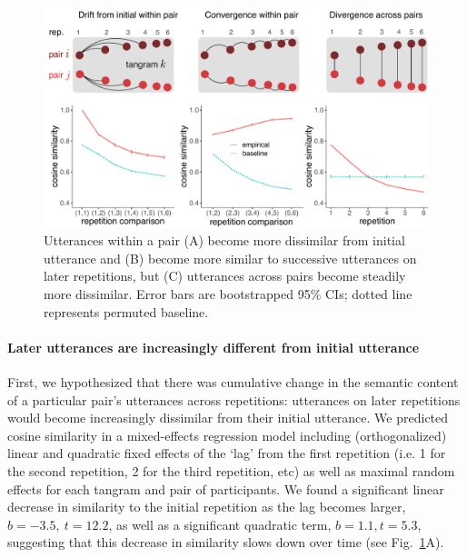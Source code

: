 \documentclass[alpha-refs]{wiley-article}
\begin{document}
\begin{figure}[t]
\includegraphics[scale=.5]{similarity_analysis.pdf}
\vspace{1em}
\caption{Utterances within a pair (A) become more dissimilar from initial utterance and (B) become more similar to successive utterances on later repetitions, but (C) utterances across pairs become steadily more dissimilar. Error bars are bootstrapped 95\% CIs; dotted line represents permuted baseline.}
\label{fig:similarity}
\end{figure}

\paragraph{Later utterances are increasingly different from initial utterance}

First, we hypothesized that there was cumulative change in the semantic content of a particular pair's utterances across repetitions: utterances on later repetitions would become increasingly dissimilar from their initial utterance.
We predicted cosine similarity in a mixed-effects regression model including (orthogonalized) linear and quadratic fixed effects of the `lag' from the first repetition (i.e. 1 for the second repetition, 2 for the third repetition, etc) as well as maximal random effects for each tangram and pair of participants.
We found a significant linear decrease in similarity to the initial repetition as the lag becomes larger, $b = -3.5,~t = 12.2$, as well as a significant quadratic term, $b=1.1, t=5.3$, suggesting that this decrease in similarity slows down over time (see Fig.~\ref{fig:similarity}A).
\end{document}
